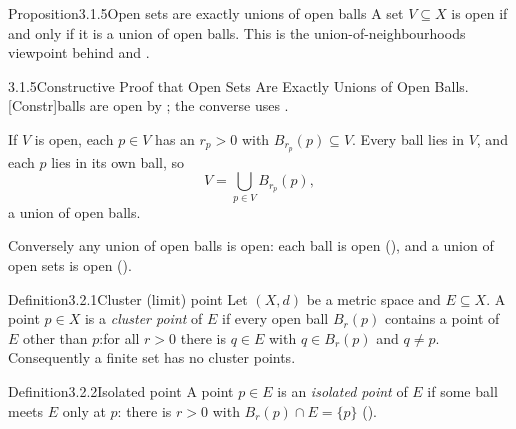 \documentclass[main.tex]{subfiles}
\begin{document}
\begin{Obj}{Proposition}{3.1.5}{Open sets are exactly unions of open balls}
A set $V\subseteq X$ is open if and only if it is a union of open balls.
This is the union-of-neighbourhoods viewpoint behind  and .
\end{Obj}
\begin{Prf}{3.1.5}{Constructive Proof that Open Sets Are Exactly Unions of Open Balls.}{[Constr]\quad balls are open by ; the converse uses .}
\item If $V$ is open, each $p\in V$ has an $r_p>0$ with $B_{r_p}(p)\subseteq V$. Every ball lies in
  $V$, and each $p$ lies in its own ball, so
  \[ V=\bigcup_{p\in V}B_{r_p}(p), \]
  a union of open balls.
\item Conversely any union of open balls is open: each ball is open (), and a union of
  open sets is open ().
\end{Prf}


\begin{Obj}{Definition}{3.2.1}{Cluster (limit) point}
Let $(X,d)$ be a metric space and $E\subseteq X$. A point $p\in X$ is a \emph{cluster point} of $E$
if every open ball $B_r(p)$ contains a point of $E$ other than $p$:\quad for all $r>0$ there is
$q\in E$ with $q\in B_r(p)$ and $q\neq p$. Consequently a finite set has no cluster points.
\end{Obj}

\begin{Obj}{Definition}{3.2.2}{Isolated point}
A point $p\in E$ is an \emph{isolated point} of $E$ if some ball meets $E$ only at $p$: there is
$r>0$ with $B_r(p)\cap E=\{p\}$ ().
\end{Obj}
\end{document}

